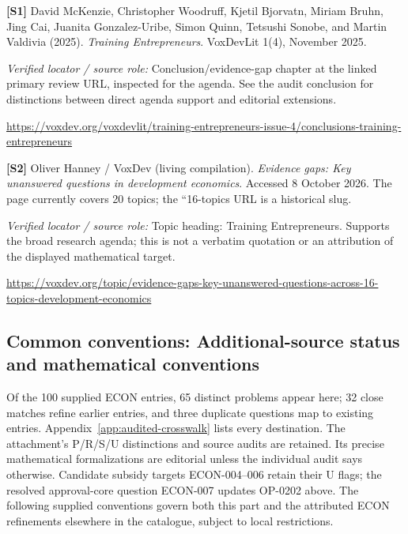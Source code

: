 \documentclass[11pt,a4paper]{article}
\begin{document}
{\footnotesize\raggedright
\par\noindent\textbf{[S1]} David McKenzie, Christopher Woodruff, Kjetil Bjorvatn, Miriam Bruhn, Jing Cai, Juanita Gonzalez-Uribe, Simon Quinn, Tetsushi Sonobe, and Martin Valdivia (2025). \emph{Training Entrepreneurs}. VoxDevLit 1(4), November 2025.\par \textit{Verified locator / source role:} Conclusion/evidence-gap chapter at the linked primary review URL, inspected for the agenda. See the audit conclusion for distinctions between direct agenda support and editorial extensions.\par \url{https://voxdev.org/voxdevlit/training-entrepreneurs-issue-4/conclusions-training-entrepreneurs}\par\smallskip
\par\noindent\textbf{[S2]} Oliver Hanney / VoxDev (living compilation). \emph{Evidence gaps: Key unanswered questions in development economics}. Accessed 8 October 2026. The page currently covers 20 topics; the ``16-topics URL is a historical slug.\par \textit{Verified locator / source role:} Topic heading: Training Entrepreneurs. Supports the broad research agenda; this is not a verbatim quotation or an attribution of the displayed mathematical target.\par \url{https://voxdev.org/topic/evidence-gaps-key-unanswered-questions-across-16-topics-development-economics}\par\smallskip
}

\subsection*{Common conventions: Additional-source status and mathematical conventions}

\label{audited:conventions}

Of the 100 supplied ECON entries, 65 distinct problems appear here; 32 close
matches refine earlier entries, and three duplicate questions map to existing
entries. Appendix~\ref{app:audited-crosswalk} lists every destination.
The attachment's P/R/S/U distinctions and source audits are retained. Its
precise mathematical formalizations are editorial unless the individual audit
says otherwise. Candidate subsidy targets ECON-004--006 retain their U flags;
the resolved approval-core question ECON-007 updates OP-0202 above.
The following supplied conventions govern both this part and the attributed
ECON refinements elsewhere in the catalogue, subject to local restrictions.
\end{document}
